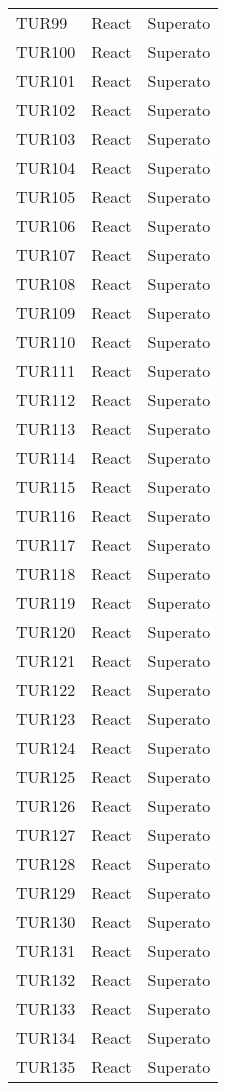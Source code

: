 \documentclass[PianoDiQualifica.tex]{subfiles}
\begin{document}
\begin{longtable}[H]{P{2cm}P{8.5cm}P{3cm}}
	TUR99 & React & Superato \\ 
	TUR100 & React & Superato \\ 
	TUR101 & React & Superato \\ 
	TUR102 & React & Superato \\ 
	TUR103 & React & Superato \\ 
	TUR104 & React & Superato \\ 
	TUR105 & React & Superato \\ 
	TUR106 & React & Superato \\ 
	TUR107 & React & Superato \\ 
	TUR108 & React & Superato \\ 
	TUR109 & React & Superato \\ 
	TUR110 & React & Superato \\ 
	TUR111 & React & Superato \\ 
	TUR112 & React & Superato \\ 
	TUR113 & React & Superato \\ 
	TUR114 & React & Superato \\ 
	TUR115 & React & Superato \\ 
	TUR116 & React & Superato \\ 
	TUR117 & React & Superato \\ 
	TUR118 & React & Superato \\ 
	TUR119 & React & Superato \\ 
	TUR120 & React & Superato \\ 
	TUR121 & React & Superato \\ 
	TUR122 & React & Superato \\ 
	TUR123 & React & Superato \\ 
	TUR124 & React & Superato \\ 
	TUR125 & React & Superato \\ 
	TUR126 & React & Superato \\ 
	TUR127 & React & Superato \\ 
	TUR128 & React & Superato \\ 
	TUR129 & React & Superato \\ 
	TUR130 & React & Superato \\ 
	TUR131 & React & Superato \\ 
	TUR132 & React & Superato \\ 
	TUR133 & React & Superato \\ 
	TUR134 & React & Superato \\ 
	TUR135 & React & Superato \\ 

\end{longtable}
\end{document}
